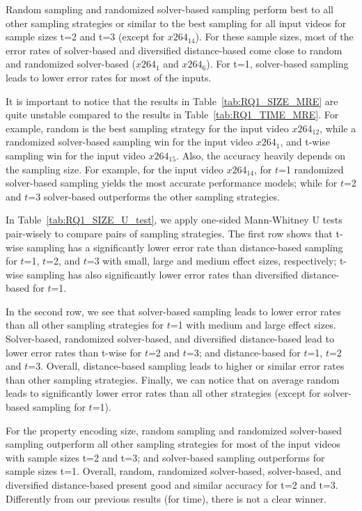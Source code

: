 Random sampling and randomized solver-based sampling perform best to all other sampling strategies or similar to the best sampling for all input videos for sample sizes t=2 and t=3 (except for $x264_{14}$).
For these sample sizes, most of the error rates of solver-based and diversified distance-based come close to random and randomized solver-based (\eg $x264_{1}$ and $x264_{6}$).
For t=1, solver-based sampling leads to lower error rates for most of the inputs.

It is important to notice that the results in Table~\ref{tab:RQ1_SIZE_MRE} are quite unstable compared to the results in Table~\ref{tab:RQ1_TIME_MRE}.
For example, random is the best sampling strategy for the input video $x264_{12}$, while a randomized solver-based sampling win for the input video $x264_1$, and t-wise sampling win for the input video $x264_{15}$.
Also, the accuracy heavily depends on the sampling size.
For example, for the input video $x264_{14}$, for $t$=1 randomized solver-based sampling yields the most accurate performance models; while for $t$=2 and $t$=3 solver-based outperforms the other sampling strategies.

In Table~\ref{tab:RQ1_SIZE_U_test}, we apply one-sided Mann-Whitney U tests pair-wisely to compare pairs of sampling strategies. 
The first row shows that t-wise sampling has a significantly lower error rate than distance-based sampling for $t$=1, $t$=2, and $t$=3 with small, large and medium effect sizes, respectively;
t-wise sampling has also significantly lower error rates than diversified distance-based for $t$=1.



In the second row, we see that solver-based sampling leads to lower error rates than all other sampling strategies for $t$=1 with medium and large effect sizes.
Solver-based, randomized solver-based, and diversified distance-based lead to lower error rates than t-wise for $t$=2 and $t$=3; and distance-based for $t$=1, $t$=2 and $t$=3.
Overall, distance-based sampling leads to higher or similar error rates than other sampling strategies.
Finally, we can notice that on average random leads to significantly lower error rates than all other strategies (except for solver-based sampling for $t$=1).

\begin{tcolorbox}
For the property encoding size, random sampling and randomized solver-based sampling outperform all other sampling strategies for most of the input videos with sample sizes t=2 and t=3; and solver-based sampling outperforms for sample sizes t=1.
Overall, random, randomized solver-based, solver-based, and diversified distance-based present good and similar accuracy for t=2 and t=3.
Differently from our previous results (for time), there is not a clear winner. %
\end{tcolorbox}


